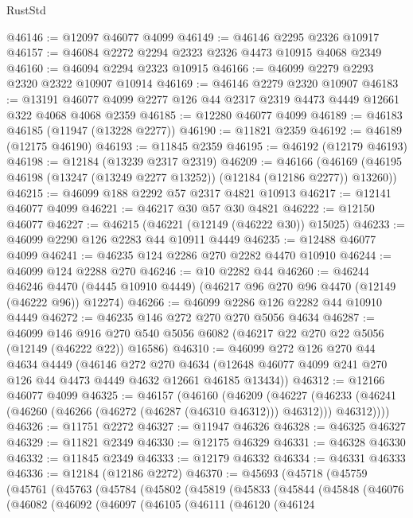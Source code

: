 \begin{lexlean}{RustStd}
\begin{coremodule}
@46146 := @12097 @46077 @4099
@46149 := @46146 @2295 @2326 @10917
@46157 := @46084 @2272 @2294 @2323 @2326 @4473 @10915 @4068 @2349
@46160 := @46094 @2294 @2323 @10915
@46166 := @46099 @2279 @2293 @2320 @2322 @10907 @10914
@46169 := @46146 @2279 @2320 @10907
@46183 := @13191 @46077 @4099 @2277 @126 @44 @2317 @2319 @4473 @4449 @12661 @322 @4068 @4068 @2359
@46185 := @12280 @46077 @4099
@46189 := @46183 @46185 (@11947 (@13228 @2277))
@46190 := @11821 @2359
@46192 := @46189 (@12175 @46190)
@46193 := @11845 @2359
@46195 := @46192 (@12179 @46193)
@46198 := @12184 (@13239 @2317 @2319)
@46209 := @46166
    (@46169 (@46195 @46198 (@13247 (@13249 @2277 @13252)) (@12184 (@12186 @2277)) @13260))
@46215 := @46099 @188 @2292 @57 @2317 @4821 @10913
@46217 := @12141 @46077 @4099
@46221 := @46217 @30 @57 @30 @4821
@46222 := @12150 @46077
@46227 := @46215 (@46221 (@12149 (@46222 @30)) @15025)
@46233 := @46099 @2290 @126 @2283 @44 @10911 @4449
@46235 := @12488 @46077 @4099
@46241 := @46235 @124 @2286 @270 @2282 @4470 @10910
@46244 := @46099 @124 @2288 @270
@46246 := @10 @2282 @44
@46260 := @46244
    @46246
    @4470
    (@4445 @10910 @4449)
    (@46217 @96 @270 @96 @4470 (@12149 (@46222 @96)) @12274)
@46266 := @46099 @2286 @126 @2282 @44 @10910 @4449
@46272 := @46235 @146 @272 @270 @270 @5056 @4634
@46287 := @46099
    @146
    @916
    @270
    @540
    @5056
    @6082
    (@46217 @22 @270 @22 @5056 (@12149 (@46222 @22)) @16586)
@46310 := @46099
    @272
    @126
    @270
    @44
    @4634
    @4449
    (@46146
      @272
      @270
      @4634
      (@12648 @46077 @4099 @241 @270 @126 @44 @4473 @4449 @4632 @12661 @46185 @13434))
@46312 := @12166 @46077 @4099
@46325 := @46157
    (@46160
      (@46209
        (@46227
          (@46233 (@46241 (@46260 (@46266 (@46272 (@46287 (@46310 @46312))) @46312))) @46312))))
@46326 := @11751 @2272
@46327 := @11947 @46326
@46328 := @46325 @46327
@46329 := @11821 @2349
@46330 := @12175 @46329
@46331 := @46328 @46330
@46332 := @11845 @2349
@46333 := @12179 @46332
@46334 := @46331 @46333
@46336 := @12184 (@12186 @2272)
@46370 := @45693
    (@45718
      (@45759
        (@45761
          (@45763
            (@45784
              (@45802
                (@45819
                  (@45833
                    (@45844
                      (@45848
                        (@46076
                          (@46082
                            (@46092
                              (@46097
                                (@46105
                                  (@46111
                                    (@46120
                                      (@46124

\end{coremodule}
\end{lexlean}
